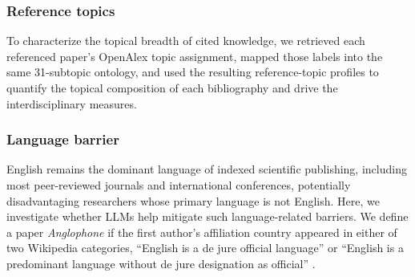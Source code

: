 \subsubsection*{Reference topics}
To characterize the topical breadth of cited knowledge, we retrieved each referenced paper's OpenAlex topic assignment\cite{priem2022openalex}, mapped those labels into the same 31-subtopic ontology, and used the resulting reference-topic profiles to quantify the topical composition of each bibliography and drive the interdisciplinary measures.


\subsubsection*{Language barrier}

English remains the dominant language of indexed scientific publishing, including most peer-reviewed journals and international conferences, potentially disadvantaging researchers whose primary language is not English. Here, we investigate whether LLMs help mitigate such language-related barriers.
We define a paper \textit{Anglophone} if the first author's affiliation country appeared in either of two Wikipedia categories, ``English is a de jure official language'' or ``English is a predominant language without de jure designation as official'' \cite{wikipediaContributors2026list}. 


